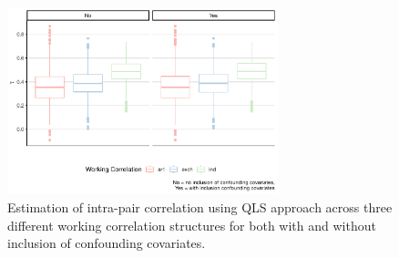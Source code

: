\documentclass[
]{aft}
\begin{document}
\begin{table}[H]
\centering\centering
\caption{\footnotesize Estimation of correlations between subjects in matched pairs using QLS approach.}
\centering
{}
\end{table}

\begin{figure}[H]

{\centering \includegraphics[width=0.7\textwidth,height=\textheight]{FinalReport_files/figure-pdf/unnamed-chunk-8-1.pdf}

}

\caption{Estimation of intra-pair correlation using QLS approach across
three different working correlation structures for both with and without
inclusion of confounding covariates.}

\end{figure}%
\end{document}

